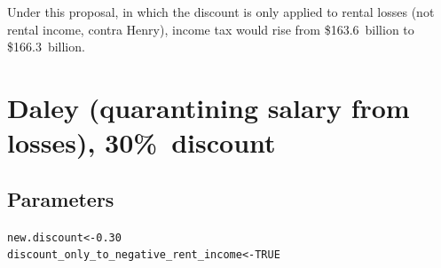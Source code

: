 \documentclass{grattan}\usepackage[]{graphicx}\usepackage[]{color}
\makeatletter
\newcommand{\hlnum}[1]{\textcolor[rgb]{0.686,0.059,0.569}{#1}}%
\newcommand{\hlstd}[1]{\textcolor[rgb]{0.345,0.345,0.345}{#1}}%
\newcommand{\hlkwb}[1]{\textcolor[rgb]{0.69,0.353,0.396}{#1}}%
\newenvironment{kframe}{%
 \def\at@end@of@kframe{}%
 \ifinner\ifhmode%
  \def\at@end@of@kframe{\end{minipage}}%
  \begin{minipage}{\columnwidth}%
 \fi\fi%
 \def\FrameCommand##1{\hskip\@totalleftmargin \hskip-\fboxsep
 \colorbox{shadecolor}{##1}\hskip-\fboxsep
     \hskip-\linewidth \hskip-\@totalleftmargin \hskip\columnwidth}%
 \MakeFramed {\advance\hsize-\width
   \@totalleftmargin\z@ \linewidth\hsize
   \@setminipage}}%
 {\par\unskip\endMakeFramed%
 \at@end@of@kframe}
\newenvironment{knitrout}{}{} %
\makeatother
\begin{document}
Under this proposal, in which the discount is only applied to rental losses (not rental income, contra Henry), income tax would rise from \$163.6~billion to \$166.3~billion.

\section{Daley (quarantining salary from losses), 30\%\ discount}
\subsection{Parameters}
\begin{knitrout}
\color{fgcolor}\begin{kframe}
\begin{alltt}
\hlstd{new.discount} \hlkwb{<-} \hlnum{0.30}
\hlstd{discount_only_to_negative_rent_income} \hlkwb{<-} \hlnum{TRUE}
\end{alltt}
\end{kframe}
\end{knitrout}
\end{document}
